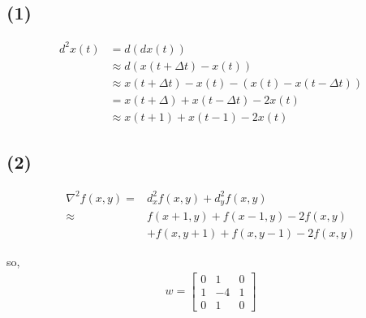 \documentclass{subfiles}
\begin{document}
\subsection*{(1)}

\begin{align*}
d^2 x(t)
& = d(dx(t)) \\
& \approx d(x(t + \Delta t) - x(t)) \\
& \approx x(t+ \Delta t) - x(t) - (x(t) - x(t - \Delta t)) \\
& = x(t + \Delta) + x(t - \Delta t) - 2x(t) \\
& \approx x(t + 1) + x(t - 1) - 2 x(t)
\end{align*}

\subsection*{(2)}

\begin{align*}
\nabla^2 f(x, y)
= & d^2_x f(x, y) + d^2_y f(x, y) \\
\approx & f(x+1, y) + f(x-1, y) - 2 f(x,y) \\
& + f(x, y+1) + f(x, y-1) - 2f(x,y)
\end{align*}

so,
\begin{align*}
w
= \left[
    \begin{array}{ccc}
        0 & 1 & 0 \\
        1 & -4 & 1 \\
        0 & 1 & 0
    \end{array}
\right]
\end{align*}
\end{document}
